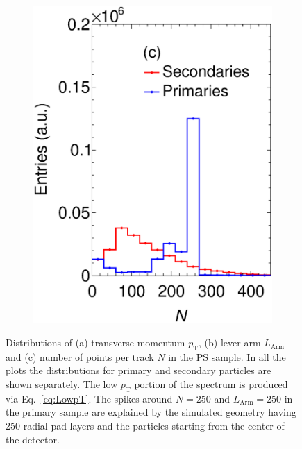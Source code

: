 \begin{figure}[t]
\begin{subfigure}[b]{0.32\textwidth}
         \includegraphics[width=\textwidth]{figures/ch5-KF_NDGAr/ToySample/testTPCMirrorNAllTall.eps}
         \caption{}
         \label{fig:NTPC}
     \end{subfigure}
        \caption[Distributions of (a) transverse momentum $p_{\textrm{T}}$,  (b) lever arm $L_{\textrm{Arm}}$ and (c) number of points per track $N$ in the PS sample.]{Distributions of (a) transverse momentum $p_{\textrm{T}}$,  (b) lever arm $L_{\textrm{Arm}}$ and (c) number of points per track $N$ in the PS sample. In all the plots the distributions for primary and secondary particles are shown separately. The low $p_{\textrm{T}}$ portion of the spectrum 
 is produced via Eq.~\ref{eq:LowpT}. The spikes around $N=250$ and $L_{\textrm{Arm}}=250$ in the primary sample are explained by the simulated geometry having 250 radial pad layers and the particles starting from the center of the detector. } \label{fig:TPCProperties}
\end{figure}


